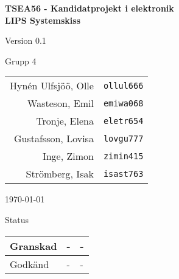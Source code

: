 \documentclass[11pt]{article}
\begin{document}
\begin{titlepage}
\begin{center}

{\Large\bfseries TSEA56 - Kandidatprojekt i elektronik \\ LIPS Systemskiss}

\vspace{5em}

Version 0.1

\vspace{5em}
Grupp 4 \\
\begin{tabular}{rl}
Hynén Ulfsjöö, Olle&\verb+ollul666+
\\
Wasteson, Emil&\verb+emiwa068+
\\
Tronje, Elena&\verb+eletr654+
\\
Gustafsson, Lovisa&\verb+lovgu777+
\\
Inge, Zimon&\verb+zimin415+
\\
Strömberg, Isak&\verb+isast763+
\\
\end{tabular}

\vspace{5em}
\today

\vspace{16em}
Status
\begin{longtable}{|l|l|l|} \hline

Granskad & - & - \\ \hline
Godkänd & - & - \\ \hline
 
\end{longtable}

\end{center}
\end{titlepage}
\end{document}
